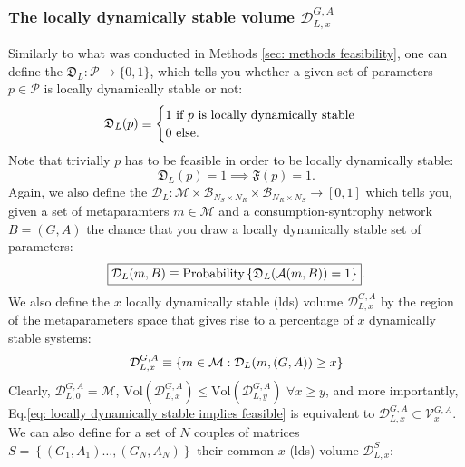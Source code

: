 \documentclass[12pt, titlepage]{report}
\begin{document}
\subsubsection{The locally dynamically stable volume $\mathcal{D}^{G,A}_{L,x}$} \label{sec: dynamical stability methods locally dynamically stable region}
Similarly to what was conducted in Methods \ref{sec: methods feasibility}, one can define the  $\mathfrak{D}_L: \mathcal{P} \rightarrow \{
0,1\}$, which tells you whether a given set of parameters $p \in \mathcal{P}$ is locally dynamically stable or not:
\begin{equation}
\mathfrak{D}_L(p)\equiv\begin{cases}
1 \text{ if } p \text{ is locally dynamically stable} \\
0 \text{ else.}
\end{cases}
\end{equation}
Note that trivially $p$ has to be feasible in order to be locally dynamically stable:
\begin{equation}
\mathfrak{D}_L(p)=1 \implies \mathfrak{F}(p)=1. \label{eq: locally dynamically stable implies feasible}
\end{equation}
Again, we also define the  $\mathcal{D}_L: \mathcal{M} \times \mathcal{B}_{N_S \times N_R} \times \mathcal{B}_{N_R \times N_S} \rightarrow [0,1]$ which tells you, given a set of metaparamters $m \in \mathcal{M}$ and a consumption-syntrophy network $B=(G,A)$ the chance that you draw a locally dynamically stable set of parameters:
\begin{equation}
\boxed{\mathcal{D}_L(m, B)\equiv\text{Probability}\left\{\mathfrak{D}_L(\mathcal{A}(m, B))=1\right\}}.
\end{equation}
We also define the $x$ locally dynamically stable (lds) volume $\mathcal{D}_{L,x}^{G,A}$ by the region of the metaparameters space that gives rise to a percentage of $x$ dynamically stable systems:
\begin{equation}
\mathcal{D}_{L,x}^{G,A} \equiv \left\{m \in \mathcal{M}: \mathcal{D}_L(m, (G,A)) \geq x \right\}
\end{equation}
Clearly, $\mathcal{D}_{L,0}^{G,A}=\mathcal{M}$, $\text{Vol}\left(\mathcal{D}_{L,x}^{G,A}\right) \leq \text{Vol}\left(\mathcal{D}_{L,y}^{G,A}\right)$ $\forall x \geq y$, and more importantly, Eq.\eqref{eq: locally dynamically stable implies feasible} is equivalent to $\mathcal{D}_{L,x}^{G,A} \subset \mathcal{V}_x^{G,A}$. We can also define for a set of $N$ couples of matrices $S=\left\{(G_1, A_1) \dots, (G_N, A_N)\right\}$ their common $x$ (lds) volume $\mathcal{D}_{L,x}^S$:
\end{document}

